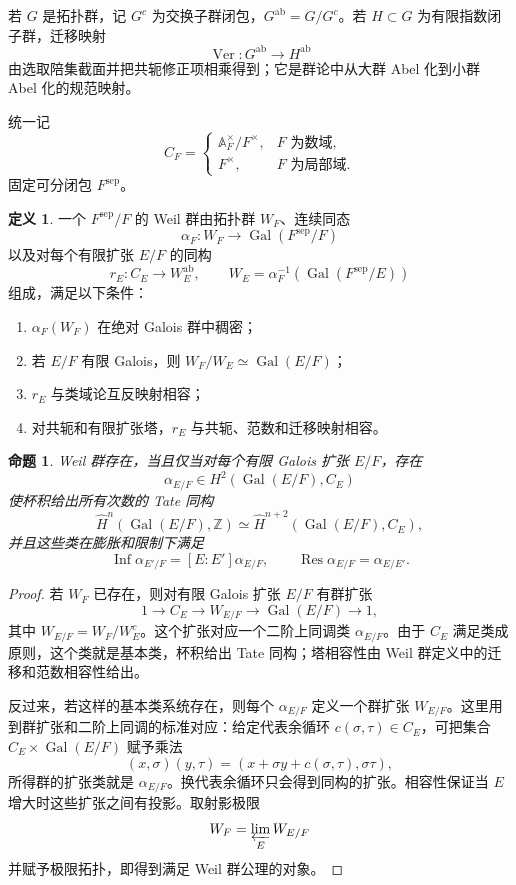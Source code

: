 \documentclass[11pt,a4paper,openany]{ctexbook}
\numberwithin{equation}{chapter}
\newcommand{\Z}{\mathbb{Z}}
\newcommand{\A}{\mathbb{A}}
\newcommand{\Gal}{\operatorname{Gal}}
\theoremstyle{plain}
\newtheorem{proposition}[theorem]{命题}
\theoremstyle{definition}
\newtheorem{definition}[theorem]{定义}
\theoremstyle{remark}
\begin{document}
若 $G$ 是拓扑群，记 $G^c$ 为交换子群闭包，$G^{\operatorname{ab}}=G/G^c$。若 $H\subset G$ 为有限指数闭子群，迁移映射
\[
\operatorname{Ver}:G^{\operatorname{ab}}\to H^{\operatorname{ab}}
\]
由选取陪集截面并把共轭修正项相乘得到；它是群论中从大群 Abel 化到小群 Abel 化的规范映射。

统一记
\[
C_F=\begin{cases}
\A_F^\times/F^\times,& F\text{ 为数域},\\
F^\times,& F\text{ 为局部域}.
\end{cases}
\]
固定可分闭包 $F^{\mathrm{sep}}$。

\begin{definition}
一个 $F^{\mathrm{sep}}/F$ 的 Weil 群由拓扑群 $W_F$、连续同态
\[
\alpha_F:W_F\to\Gal(F^{\mathrm{sep}}/F)
\]
以及对每个有限扩张 $E/F$ 的同构
\[
r_E:C_E\to W_E^{\operatorname{ab}},\qquad
W_E=\alpha_F^{-1}(\Gal(F^{\mathrm{sep}}/E))
\]
组成，满足以下条件：
\begin{enumerate}
\item $\alpha_F(W_F)$ 在绝对 Galois 群中稠密；
\item 若 $E/F$ 有限 Galois，则 $W_F/W_E\simeq\Gal(E/F)$；
\item $r_E$ 与类域论互反映射相容；
\item 对共轭和有限扩张塔，$r_E$ 与共轭、范数和迁移映射相容。
\end{enumerate}
\end{definition}

\begin{proposition}
Weil 群存在，当且仅当对每个有限 Galois 扩张 $E/F$，存在
\[
\alpha_{E/F}\in H^2(\Gal(E/F),C_E)
\]
使杯积给出所有次数的 Tate 同构
\[
\widehat H^n(\Gal(E/F),\Z)\simeq \widehat H^{n+2}(\Gal(E/F),C_E),
\]
并且这些类在膨胀和限制下满足
\[
\operatorname{Inf}\alpha_{E'/F}=[E:E']\alpha_{E/F},\qquad
\operatorname{Res}\alpha_{E/F}=\alpha_{E/E'}.
\]
\end{proposition}

\begin{proof}
若 $W_F$ 已存在，则对有限 Galois 扩张 $E/F$ 有群扩张
\[
1\to C_E\to W_{E/F}\to\Gal(E/F)\to1,
\]
其中 $W_{E/F}=W_F/W_E^c$。这个扩张对应一个二阶上同调类 $\alpha_{E/F}$。由于 $C_E$ 满足类成原则，这个类就是基本类，杯积给出 Tate 同构；塔相容性由 Weil 群定义中的迁移和范数相容性给出。

反过来，若这样的基本类系统存在，则每个 $\alpha_{E/F}$ 定义一个群扩张 $W_{E/F}$。这里用到群扩张和二阶上同调的标准对应：给定代表余循环 $c(\sigma,\tau)\in C_E$，可把集合 $C_E\times\Gal(E/F)$ 赋予乘法
\[
(x,\sigma)(y,\tau)=(x+\sigma y+c(\sigma,\tau),\sigma\tau),
\]
所得群的扩张类就是 $\alpha_{E/F}$。换代表余循环只会得到同构的扩张。相容性保证当 $E$ 增大时这些扩张之间有投影。取射影极限
\[
W_F=\varprojlim_E W_{E/F}
\]
并赋予极限拓扑，即得到满足 Weil 群公理的对象。
\end{proof}
\end{document}
